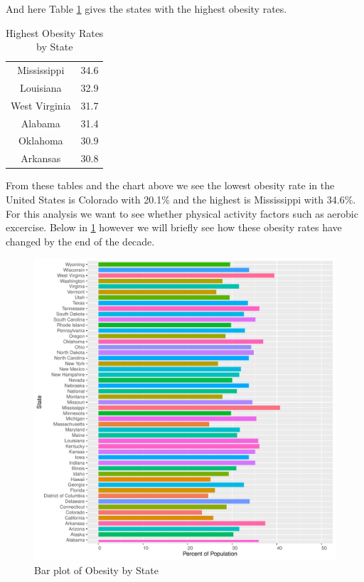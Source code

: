 \documentclass[
]{article}
\begin{document}
And here Table \ref{tab:tab3} gives the states with the highest obesity rates.

\begin{table}[H]

\caption{\label{tab:tab3}Highest Obesity Rates by State}
\centering
\begin{tabular}[t]{cc}
\toprule
Mississippi & 34.6\\
Louisiana & 32.9\\
West Virginia & 31.7\\
Alabama & 31.4\\
Oklahoma & 30.9\\
\addlinespace
Arkansas & 30.8\\
\bottomrule
\end{tabular}
\end{table}

From these tables and the chart above we see the lowest obesity rate in the United States is Colorado with 20.1\% and the highest is Mississippi with 34.6\%. For this analysis we want to see whether physical activity factors such as aerobic excercise. Below in \ref{fig:fig2} however we will briefly see how these obesity rates have changed by the end of the decade.

\begin{figure}
\centering
\includegraphics{paper_files/figure-latex/fig2-1.pdf}
\caption{\label{fig:fig2}Bar plot of Obesity by State}
\end{figure}
\end{document}
